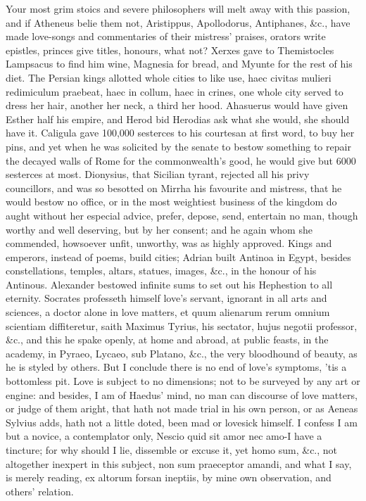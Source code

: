 {Your most grim stoics and severe philosophers will melt away with this
passion, and if Atheneus belie them not, Aristippus, Apollodorus,
Antiphanes, \&c., have made love-songs and commentaries of their
mistress' praises, orators write epistles, princes give titles,
honours, what not? Xerxes gave to Themistocles Lampsacus to find
him wine, Magnesia for bread, and Myunte for the rest of his diet. The
Persian kings allotted whole cities to like use, haec civitas
mulieri redimiculum praebeat, haec in collum, haec in crines, one whole
city served to dress her hair, another her neck, a third her hood.
Ahasuerus would have given Esther half his empire, and
Herod bid Herodias ask what she would, she should have it.
Caligula gave 100,000 sesterces to his courtesan at first word, to buy
her pins, and yet when he was solicited by the senate to bestow
something to repair the decayed walls of Rome for the commonwealth's
good, he would give but 6000 sesterces at most. Dionysius, that
Sicilian tyrant, rejected all his privy councillors, and was so
besotted on Mirrha his favourite and mistress, that he would bestow no
office, or in the most weightiest business of the kingdom do aught
without her especial advice, prefer, depose, send, entertain no man,
though worthy and well deserving, but by her consent; and he again whom
she commended, howsoever unfit, unworthy, was as highly approved. Kings
and emperors, instead of poems, build cities; Adrian built Antinoa in
Egypt, besides constellations, temples, altars, statues, images, \&c.,
in the honour of his Antinous. Alexander bestowed infinite sums to set
out his Hephestion to all eternity. Socrates professeth himself
love's servant, ignorant in all arts and sciences, a doctor alone in
love matters, et quum alienarum rerum omnium scientiam diffiteretur,
saith Maximus Tyrius, his sectator, hujus negotii professor, \&c.,
and this he spake openly, at home and abroad, at public feasts, in the
academy, in Pyraeo, Lycaeo, sub Platano, \&c., the very bloodhound of
beauty, as he is styled by others. But I conclude there is no end of
love's symptoms, 'tis a bottomless pit. Love is subject to no
dimensions; not to be surveyed by any art or engine: and besides, I am
of Haedus' mind, no man can discourse of love matters, or judge
of them aright, that hath not made trial in his own person, or as
Aeneas Sylvius adds, hath not a little doted, been mad or
lovesick himself. I confess I am but a novice, a contemplator only,
Nescio quid sit amor nec amo-I have a tincture; for why should I
lie, dissemble or excuse it, yet homo sum, \&c., not altogether inexpert
in this subject, non sum praeceptor amandi, and what I say, is merely
reading, ex altorum forsan ineptiis, by mine own observation, and
others' relation.

}
